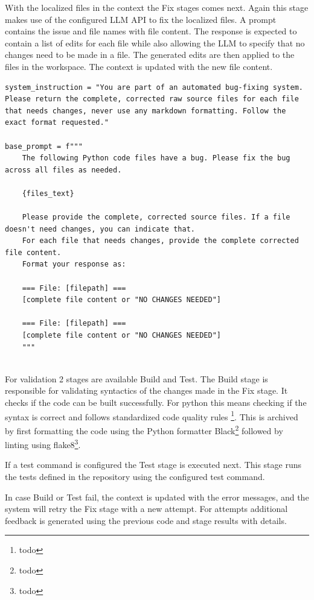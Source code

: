 With the localized files in the context the Fix stages comes next. Again this stage makes use of the configured LLM API to fix the localized files. A prompt contains the issue and file names with file content. The response is expected to contain a list of edits for each file while also allowing the LLM to specify that no changes need to be made in a file. The generated edits are then applied to the files in the workspace. The context is updated with the new file content.

\begin{lstlisting}[caption={Repair Prompt}]
system_instruction = "You are part of an automated bug-fixing system. Please return the complete, corrected raw source files for each file that needs changes, never use any markdown formatting. Follow the exact format requested."

base_prompt = f"""
    The following Python code files have a bug. Please fix the bug across all files as needed.

    {files_text}

    Please provide the complete, corrected source files. If a file doesn't need changes, you can indicate that.
    For each file that needs changes, provide the complete corrected file content.
    Format your response as:

    === File: [filepath] ===
    [complete file content or "NO CHANGES NEEDED"]

    === File: [filepath] ===
    [complete file content or "NO CHANGES NEEDED"]
    """
    
\end{lstlisting}

For validation 2 stages are available Build and Test. The Build stage is responsible for validating syntactics of the changes made in the Fix stage. It checks if the code can be built successfully. For python this means checking if the syntax is correct and follows standardized code quality rules \footnote{todo}. This is archived by first formatting the code using the Python formatter Black\footnote{todo} followed by linting using flake8\footnote{todo}.

If a test command is configured the Test stage is executed next. This stage runs the tests defined in the repository using the configured test command.

In case Build or Test fail, the context is updated with the error messages, and the system will retry the Fix stage with a new attempt. For attempts additional feedback is generated using the previous code and stage results with details.

